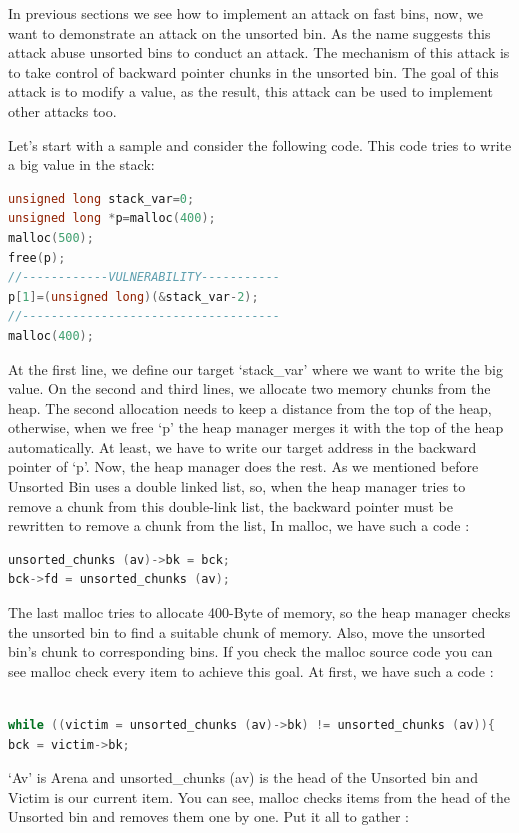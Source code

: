 \documentclass{masterthesis}
\begin{document}
In previous sections we see how to implement an attack on fast bins, now, we want to demonstrate an attack on the unsorted bin. As the name suggests this attack abuse unsorted bins to conduct an attack. The mechanism of this attack is to take control of backward pointer chunks in the unsorted bin. The goal of this attack is to modify a value, as the result, this attack can be used to implement other attacks too.

Let’s start with a sample and consider the following code. This code tries to write a big value in the stack:
\begin{lstlisting}[language=c,frame=tlrb]
unsigned long stack_var=0;
unsigned long *p=malloc(400);
malloc(500);
free(p);
//------------VULNERABILITY-----------
p[1]=(unsigned long)(&stack_var-2);
//------------------------------------
malloc(400);
\end{lstlisting}
 At the first line, we define our target ‘stack\_var’ where we want to write the big value. On the second and third lines, we allocate two memory chunks from the heap. The second allocation needs to keep a distance from the top of the heap, otherwise, when we free ‘p’ the heap manager merges it with the top of the heap automatically. At least, we have to write our target address in the backward pointer of ‘p’. Now, the heap manager does the rest. As we mentioned before Unsorted Bin uses a double linked list, so, when the heap manager tries to remove a chunk from this double-link list, the backward pointer must be rewritten to remove a chunk from the list, In malloc, we have such a code : 
 
\begin{lstlisting}[language=c,frame=tlrb]
unsorted_chunks (av)->bk = bck;
bck->fd = unsorted_chunks (av);
\end{lstlisting}

The last malloc tries to allocate 400-Byte of memory, so the heap manager checks the unsorted bin to find a suitable chunk of memory. Also, move the unsorted bin’s chunk to corresponding bins. If you check the malloc source code you can see malloc check every item to achieve this goal. At first, we have such a code :
\begin{lstlisting}[language=c,frame=tlrb]

while ((victim = unsorted_chunks (av)->bk) != unsorted_chunks (av)){
bck = victim->bk;
\end{lstlisting}
‘Av’ is Arena and unsorted\_chunks (av) is the head of the Unsorted bin and Victim is our current item. You can see, malloc checks items from the head of the Unsorted bin and removes them one by one. Put it all to gather :
\end{document}

